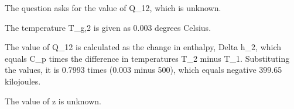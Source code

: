 The question asks for the value of Q_{12}, which is unknown.

The temperature T_{g,2} is given as 0.003 degrees Celsius.

The value of Q_{12} is calculated as the change in enthalpy, Delta h_2, which equals C_p times the difference in temperatures T_2 minus T_1. Substituting the values, it is 0.7993 times (0.003 minus 500), which equals negative 399.65 kilojoules.

The value of z is unknown.